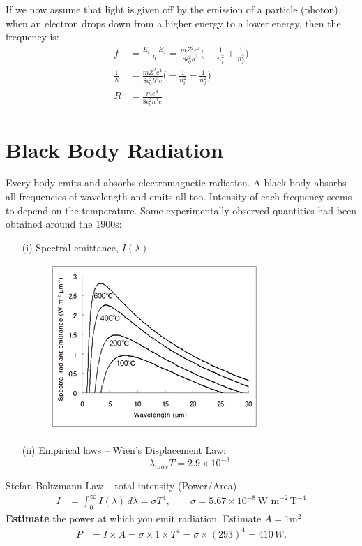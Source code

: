 \documentclass[a4paper, 11pt, normalem]{report}
\begin{document}
If we now assume that light is given off by the emission of a particle (photon), when an electron drops down from a higher energy to a lower energy, then the frequency is:
\begin{align}
    f &= \frac{E_{i} - E_{f}}{h} = \frac{mZ^{2}e^{4}}{8\epsilon_{0}^{2}h^{3}}\Big(-\frac{1}{n_{i}^{2}} + \frac{1}{n_{f}^{2}}\Big) \\
    \frac{1}{\lambda} &= \frac{mZ^{2}e^{4}}{8\epsilon_{0}^{2}h^{3}c}\Big(-\frac{1}{n_{i}^{2}} + \frac{1}{n_{f}^{2}}\Big) \\
    R &= \frac{me^{4}}{8\epsilon_{0}^{2}h^{3}c}
\end{align}

\section{Black Body Radiation}
Every body emits and absorbs electromagnetic radiation.
A black body absorbs all frequencies of wavelength and emits all too.
Intensity of each frequency seems to depend on the temperature.
Some experimentally observed quantities had been obtained around the 1900s: 
\begin{itemize}
    \item[(i)] Spectral emittance, $I(\lambda)$ 
        \begin{figure}[H]
            \centering
            \includegraphics{SpectralEmit.jpg} 
        \end{figure}
    \item[(ii)] Empirical laws -- Wien's Displacement Law:
        \begin{equation}
            \lambda_{max}T = 2.9\times10^{-3}
        \end{equation}
\end{itemize}
Stefan-Boltzmann Law -- total intensity (Power/Area)
\begin{align}
    I &= \int_{0}^{\infty} I(\lambda)\,d\lambda = \sigma T^{4},\qquad \sigma = 5.67\times10^{-8}\,\text{W m}^{-2}\,\text{T}^{-4}
\end{align}
\textbf{Estimate} the power at which you emit radiation.
Estimate $A = 1$m$^{2}$.
\begin{align}
    P &= I \times A = \sigma \times 1 \times T^{4} = \sigma \times (293)^{4} = 410\,W.
\end{align}
\end{document}
